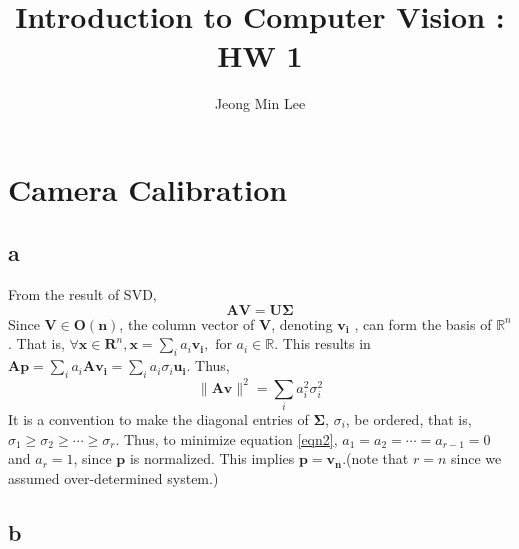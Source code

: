 \documentclass[10pt]{article}
\title{\textbf{Introduction to Computer Vision : HW 1}}
\author{Jeong Min Lee}
\begin{document}
\maketitle

\section{Camera Calibration}
\subsection*{a}
From the result of SVD, 
\begin{equation}
    \mathbf{AV=U\Sigma}
\end{equation}
Since $\mathbf{V \in O(n)}$, the column vector of $\mathbf{V}$, denoting $\mathbf{v_i}$ , can form the basis of $\mathbb{R}^n$. That is, $\forall \mathbf{x} \in \mathbf{R}^n, \mathbf{x} = \sum_i a_i \mathbf{v_i},\text{ for } a_i \in \mathbb{R}$.
This results in $\mathbf{Ap} =\sum_i a_i \mathbf{Av_i} = \sum_i a_i\sigma_i \mathbf{u_i}$. Thus,
\begin{equation}
    \lVert \mathbf{Av}\rVert^2 = \sum_i a_i^2\sigma_i^2
    \label{eqn2}
\end{equation}
It is a convention to make the diagonal entries of $\mathbf{\Sigma}$, $\sigma_i$, be ordered, that is, $\sigma_1 \ge \sigma_2 \ge \cdots \ge \sigma_r$.
Thus, to minimize equation \ref{eqn2}, $a_1 = a_2 = \cdots = a_{r-1} = 0$ and $a_r = 1$, since $\mathbf{p}$ is normalized. This implies $\mathbf{p = v_n}$.(note that $r = n$ since we assumed over-determined system.)

\subsection*{b}
\end{document}
